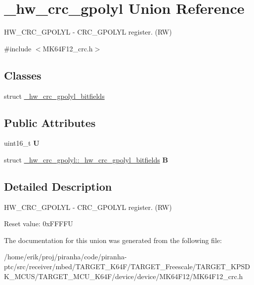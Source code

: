 \hypertarget{union__hw__crc__gpolyl}{}\section{\+\_\+hw\+\_\+crc\+\_\+gpolyl Union Reference}
\label{union__hw__crc__gpolyl}


H\+W\+\_\+\+C\+R\+C\+\_\+\+G\+P\+O\+L\+YL -\/ C\+R\+C\+\_\+\+G\+P\+O\+L\+YL register. (RW)  




{\ttfamily \#include $<$M\+K64\+F12\+\_\+crc.\+h$>$}

\subsection*{Classes}
\begin{DoxyCompactItemize}
\item 
struct \hyperlink{struct__hw__crc__gpolyl_1_1__hw__crc__gpolyl__bitfields}{\+\_\+hw\+\_\+crc\+\_\+gpolyl\+\_\+bitfields}
\end{DoxyCompactItemize}
\subsection*{Public Attributes}
\begin{DoxyCompactItemize}
\item 
uint16\+\_\+t {\bfseries U}\hypertarget{union__hw__crc__gpolyl_a0507ec2a219f83ef5d28c9e111c25d6b}{}\label{union__hw__crc__gpolyl_a0507ec2a219f83ef5d28c9e111c25d6b}

\item 
struct \hyperlink{struct__hw__crc__gpolyl_1_1__hw__crc__gpolyl__bitfields}{\+\_\+hw\+\_\+crc\+\_\+gpolyl\+::\+\_\+hw\+\_\+crc\+\_\+gpolyl\+\_\+bitfields} {\bfseries B}\hypertarget{union__hw__crc__gpolyl_ac84aa21b9f303f6ad5f3318b1ef5cb08}{}\label{union__hw__crc__gpolyl_ac84aa21b9f303f6ad5f3318b1ef5cb08}

\end{DoxyCompactItemize}


\subsection{Detailed Description}
H\+W\+\_\+\+C\+R\+C\+\_\+\+G\+P\+O\+L\+YL -\/ C\+R\+C\+\_\+\+G\+P\+O\+L\+YL register. (RW) 

Reset value\+: 0x\+F\+F\+F\+FU 

The documentation for this union was generated from the following file\+:\begin{DoxyCompactItemize}
\item 
/home/erik/proj/piranha/code/piranha-\/ptc/src/receiver/mbed/\+T\+A\+R\+G\+E\+T\+\_\+\+K64\+F/\+T\+A\+R\+G\+E\+T\+\_\+\+Freescale/\+T\+A\+R\+G\+E\+T\+\_\+\+K\+P\+S\+D\+K\+\_\+\+M\+C\+U\+S/\+T\+A\+R\+G\+E\+T\+\_\+\+M\+C\+U\+\_\+\+K64\+F/device/device/\+M\+K64\+F12/M\+K64\+F12\+\_\+crc.\+h\end{DoxyCompactItemize}
